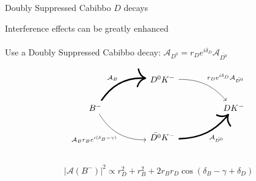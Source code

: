 \documentclass[dvipsnames]{beamer}
\begin{document}
\begin{frame}[fragile]{Doubly Suppressed Cabibbo $D$ decays}
  \begin{center}
    Interference effects can be greatly enhanced\\~\\
    Use a Doubly Suppressed Cabibbo decay: $\mathcal{A}_{D^0} = r_De^{i\delta_D}\mathcal{A}_{\bar{D^0}}$
  \end{center}
  \begin{equation*}
    \begin{tikzcd}[column sep=huge]
      & D^0K^- \arrow[dr, bend left = 25, "r_De^{i\delta_D}\mathcal{A}_{\bar{D^0}}"] & \\
      B^- \arrow[ur, bend left, line width = 1.7, "\mathcal{A}_B"] \arrow[dr, bend right, "\mathcal{A}_B r_B e^{i(\delta_B - \gamma)}"'] & [5cm] & DK^- \\
      & \bar{D^0}K^- \arrow[ur, bend right = 25, line width = 1.7, "\mathcal{A}_{\bar{D^0}}"'] & \\
    \end{tikzcd}
  \end{equation*}
  \begin{equation*}
    \lvert\mathcal{A}(B^-)\lvert^2\propto r_D^2 + r_B^2 + 2r_Br_D\cos(\delta_B - \gamma + \delta_D)
  \end{equation*}
\end{frame}
\end{document}
